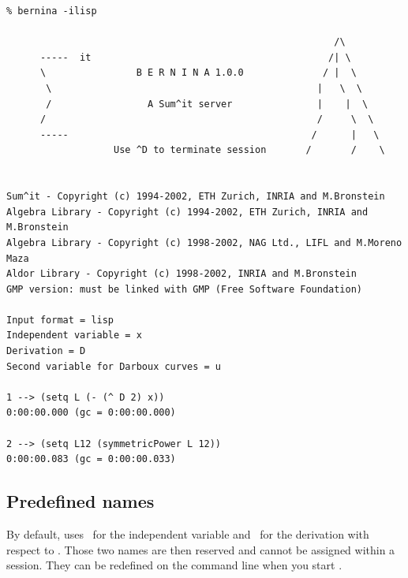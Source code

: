 \pagebreak
\begin{verbatim}
% bernina -ilisp

                                                          /\    
      -----  it                                          /| \    
      \                B E R N I N A 1.0.0              / |  \    
       \                                               |   \  \   
       /                 A Sum^it server               |    |  \  
      /                                                /     \  \ 
      -----                                           /      |   \
                   Use ^D to terminate session       /       /    \


Sum^it - Copyright (c) 1994-2002, ETH Zurich, INRIA and M.Bronstein
Algebra Library - Copyright (c) 1994-2002, ETH Zurich, INRIA and M.Bronstein
Algebra Library - Copyright (c) 1998-2002, NAG Ltd., LIFL and M.Moreno Maza
Aldor Library - Copyright (c) 1998-2002, INRIA and M.Bronstein
GMP version: must be linked with GMP (Free Software Foundation)

Input format = lisp
Independent variable = x
Derivation = D
Second variable for Darboux curves = u

1 --> (setq L (- (^ D 2) x))
0:00:00.000 (gc = 0:00:00.000)

2 --> (setq L12 (symmetricPower L 12))
0:00:00.083 (gc = 0:00:00.033)
\end{verbatim}

\subsection{Predefined names}
By default, \bernina{} uses \xx~for the independent variable and
\DD~for the derivation with respect to \xx. Those two names are
then reserved and cannot be assigned within a session. They can
be redefined on the command line when you start \bernina.

